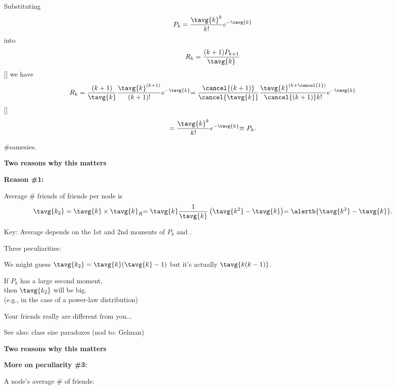 \begin{frame}[label=]
\begin{frame}[label=]
\begin{frame}[label=]
\begin{frame}[label=]
\begin{frame}[label=]
\begin{frame}[label=]
\begin{frame}[label=]
\begin{frame}[label=]
\begin{frame}[label=]
\begin{frame}[label=]
\begin{frame}[label=]
\begin{frame}[label=]
\begin{frame}[label=]
\begin{frame}[label=]
\begin{frame}[label=]
\begin{frame}[label=]
\begin{frame}[label=]
    Substituting
    $$
    P_k
    =
    \frac{\tavg{k}^k}
    {k!}
    e^{-\tavg{k}}
    $$
    into
    $$
    R_k
    =
    \frac{(k+1)P_{k+1}}
    {\tavg{k}}
    $$
  []
    we have
    $$
    R_k
    =
    \frac{(k+1)}
    {\tavg{k}}
    \frac{\tavg{k}^{(k+1)}}
    {(k+1)!}
    e^{-\tavg{k}}
    {
    =
    \frac{\cancel{(k+1)}}
    {\cancel{\tavg{k}}}
    \frac{\tavg{k}^{(k+\cancel{1})}}
    {\cancel{(k+1)} k!}
    e^{-\tavg{k}}
    }
    $$
  []
    $$
    =
    \frac{\tavg{k}^{k}}
    {k!}
    e^{-\tavg{k}}
    {
    \equiv P_k.}
    $$
  
    \#samesies.
  
 

\begin{frame}[label=]
  \textbf{Two reasons why this matters}
  
  \small
  
  \textbf{Reason \#1:}
    
     
      Average \# friends of friends per node
      is 
      $$
      \tavg{k_2}
      =
      \tavg{k} \times \tavg{k}_{R}
      {
        =
        \tavg{k}
        \frac{1}{\tavg{k}}
        \left(
          \tavg{k^2} - \tavg{k}
        \right)
      }
      {
        = \alertb{\tavg{k^2} - \tavg{k}}.
      }
      $$
    
      Key: Average depends on the \alert{1st and 2nd
        moments} of $P_k$ and .
    
      Three peculiarities:
      
      
        We might guess $\tavg{k_2} = \tavg{k}(\tavg{k}-1)$
        but it's actually $\tavg{k(k-1)}$.
      
        If $P_k$ has a \alert{large second moment},\\
        then $\tavg{k_2}$ will be big.\\
        {(e.g., in the case of a power-law distribution)}
      
        Your friends really are different from you...\cite{feld1991a,newman2003h}
      
        See also: class size paradoxes (nod to: Gelman)
      
    
    
  
  

\begin{frame}[label=]
  \textbf{Two reasons why this matters}
  
  \textbf{More on peculiarity \#3:}
    
    
      A node's average \# of friends: 
     

\end{frame}
\end{frame}
\end{frame}
\end{frame}
\end{frame}
\end{frame}
\end{frame}
\end{frame}
\end{frame}
\end{frame}
\end{frame}
\end{frame}
\end{frame}
\end{frame}
\end{frame}
\end{frame}
\end{frame}
\end{frame}
\end{frame}
